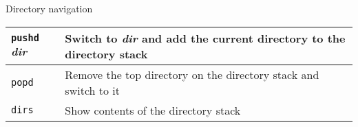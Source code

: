 \begin{block}{Directory navigation}
  \begin{tabu} to 0.9\linewidth { X X[4] }
    \texttt{pushd} \textit{dir} & Switch to \textit{dir} and add the current directory to the directory stack \\ \hline
    \texttt{popd} & Remove the top directory on the directory stack and switch to it \\ \hline
    \texttt{dirs} & Show contents of the directory stack
  \end{tabu}
\end{block}
